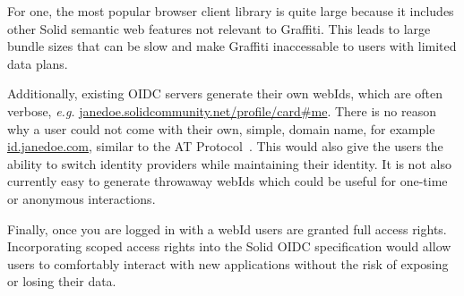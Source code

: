 For one, the most popular browser client library is quite large
because it includes other Solid semantic web features not relevant to Graffiti.
This leads to large bundle sizes that can be slow and make Graffiti inaccessable
to users with limited data plans.

Additionally, existing OIDC servers generate their own
webIds, which are often verbose,
\emph{e.g.} \url{janedoe.solidcommunity.net/profile/card#me}.
There is no reason why a user could not come with their own, simple, domain name, for example
\url{id.janedoe.com}, similar to the AT Protocol~\cite{bluesky}. This would also give the users the ability
to switch identity providers while maintaining their identity.
It is not also currently easy to generate throwaway webIds
which could be useful for one-time or anonymous interactions.

Finally, once you are logged in with a webId users are
granted full access rights. Incorporating scoped access rights
into the Solid OIDC specification would allow users to comfortably
interact with new applications without the risk of exposing or losing
their data.
